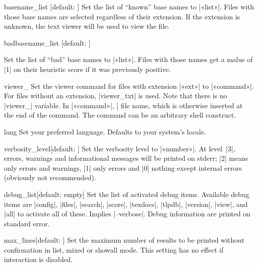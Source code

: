 \documentclass[draft]{texdoc-doc}
\begin{document}
\begin{confitem}{basename\_list}
  {}[default: ]
Set the list of ``known'' base names to |«list»|. Files with those base names
are selected regardless of their extension. If the extension is unknown, the
text viewer will be used to view the file.
\end{confitem}

\begin{confitem}{badbasename\_list}
  {}[default: ]

Set the list of ``bad'' base names to |«list»|. Files with those names get a
malus of |1| on their heuristic score if it was previously positive.
\end{confitem}

\begin{confitem}{viewer\_}{}
Set the viewer command for files with extension |«ext»| to |«command»|. For
files without an extension, |viewer_txt| is used. Note that there is no
|viewer_| variable. In |«command»|, |%
file name, which is otherwise inserted at the end of the command. The command
can be an arbitrary shell construct.
\end{confitem}

\begin{confitem}{lang}{}
Set your preferred language. Defaults to your system's locale.
\end{confitem}

\begin{confitem}{verbosity\_level}{}[default: ]
Set the verbosity level to |«number»|. At level~|3|, errors, warnings and
informational messages will be printed on stderr; |2| means only errors and
warnings, |1| only errors and |0| nothing except internal errors (obviously not
recommended).
\end{confitem}

\begin{confitem}{debug\_list}{}[default: empty]
Set the list of activated debug items. Available debug items are |config|,
|files|, |search|, |score|, |texdocs|, |tlpdb|, |version|, |view|, and |all| to
activate all of these. Implies |--verbose|. Debug information are printed on
standard error.
\end{confitem}

\begin{confitem}{max\_lines}{}[default: ]
Set the maximum number of results to be printed without confirmation in list,
mixed or showall mode. This setting has no effect if interaction is disabled.
\end{confitem}
\end{document}
